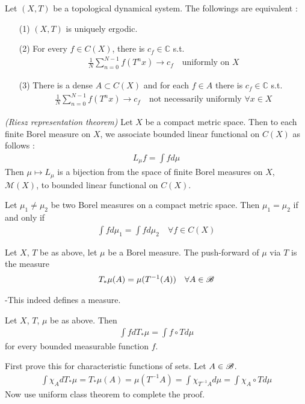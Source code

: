 \documentclass[10pt,a4paper]{report}
\newenvironment{proof}
{\begin{changemargin}{1cm}{0.5cm} 
	}%
	{\end{changemargin}
}
\begin{document}
\thm Let $(X,T)$ be a topological dynamical system. The followings are equivalent :
\begin{itemize}
\item[(1)] $(X,T)$ is uniquely ergodic.
\item[(2)] For every $f\in C(X)$, there is $c_f \in \mathbb{C}$ s.t. 
\begin{align*}
\frac{1}{N} \sum_{n=0}^{N-1} f(T^n x) \rightarrow c_f \quad \text{uniformly on } X
\end{align*}
\item[(3)]  There is a dense $A\subset C(X)$ and for each $f\in A$ there is $c_f \in \mathbb{C}$ s.t.
\begin{align*}
\frac{1}{N} \sum_{n=0}^{N-1} f(T^n x) \rightarrow c_f \quad \text{not necessarily uniformly } \forall x\in X
\end{align*}
\end{itemize}
\s

\thm \emph{(Riesz representation theorem)}  Let $X$ be a compact metric space. Then to each finite Borel measure on $X$, we associate bounded linear functional on $C(X)$ as follows : 
\begin{align*}
L_{\mu} f= \int f d\mu
\end{align*}
Then $\mu \mapsto L_{\mu}$ is a bijection from the space of finite Borel measures on $X$, $\mathscr{M}(X)$, to bounded linear functional on $C(X)$.
\s 

\cor Let $\mu_1 \neq \mu_2$ be two Borel measures on a compact metric space. Then $\mu_1 = \mu_2$ if and only if
\begin{align*}
\int f d\mu_1 = \int f d\mu_2 \quad \forall f \in C(X)
\end{align*}
\s

 Let $X$, $T$ be as above, let $\mu$ be a Borel measure. The push-forward of $\mu$ via $T$ is the measure
\begin{align*}
T_{*} \mu (A) = \mu(T^{-1}(A)) \quad \forall A\in \mathscr{B}
\end{align*}

-This indeed defines a measure.
\s

\lem Let $X$, $T$, $\mu$ be as above. Then
\begin{align*}
\int f dT_{*}\mu = \int f \circ T d\mu
\end{align*}
for every bounded measurable function $f$.
\begin{proof}
\pf First prove this for characteristic functions of sets. Let $A\in \mathscr{B}$.
\begin{align*}
\int \chi_A dT_* \mu = T_* \mu(A) = \mu(T^{-1} A) = \int \chi_{T^{-1} A } d\mu = \int \chi_A \circ T d\mu 
\end{align*}
Now use uniform class theorem to complete the proof.

\eop
\end{proof}
\s
\end{document}
